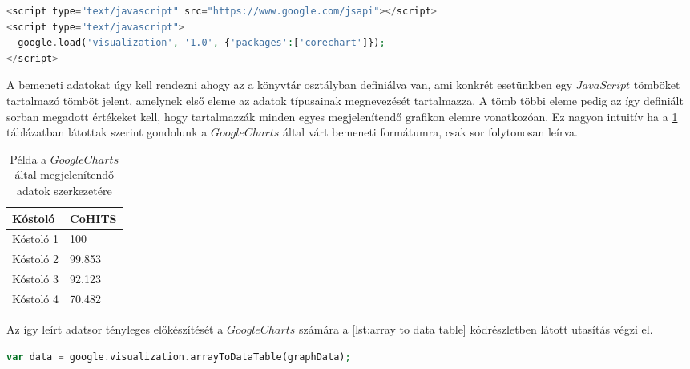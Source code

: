 \documentclass[12pt]{report}
\theoremstyle{definition}
\begin{document}
	\noindent\begin{minipage}{\linewidth}
		\begin{lstlisting}[language=php,label={lst:init google charts}, caption={Google Charts API betöltése}]
<script type="text/javascript" src="https://www.google.com/jsapi"></script>
<script type="text/javascript">
  google.load('visualization', '1.0', {'packages':['corechart']});
</script>
		\end{lstlisting}
	\end{minipage}  
	
	A bemeneti adatokat úgy kell rendezni ahogy az a könyvtár osztályban definiálva van, ami konkrét esetünkben egy $JavaScript$ tömböket tartalmazó tömböt jelent, amelynek első eleme az adatok típusainak megnevezését tartalmazza. A tömb többi eleme pedig az így definiált sorban megadott értékeket kell, hogy tartalmazzák minden egyes megjelenítendő grafikon elemre vonatkozóan. Ez nagyon intuitív ha a \ref{tbl:google charts data table} táblázatban látottak szerint gondolunk a $Google Charts$ által várt bemeneti formátumra, csak sor folytonosan leírva.
	
	\begin{table}[!ht]
		\begin{center}
			\begin{tabular}{| l | l |}
				\hline
				\textbf{Kóstoló} & \textbf{CoHITS} \\ \hline
				Kóstoló 1 & 100 \\ \hline
				Kóstoló 2 & 99.853 \\ \hline
				Kóstoló 3 & 92.123 \\ \hline
				Kóstoló 4 & 70.482 \\ \hline
			\end{tabular}
		\end{center}
		\caption{Példa a $Google Charts$ által megjelenítendő adatok szerkezetére \label{tbl:google charts data table}}
	\end{table}
	
	Az így leírt adatsor tényleges előkészítését a $Google Charts$ számára a \ref{lst:array to data table} kódrészletben látott utasítás végzi el.
	
	\noindent\begin{minipage}{\linewidth}
		\begin{lstlisting}[language=php,label={lst:array to data table}, caption={Google Charts tömbből google data table készítés}]
var data = google.visualization.arrayToDataTable(graphData);
		\end{lstlisting}
	\end{minipage}
	
\end{document}
